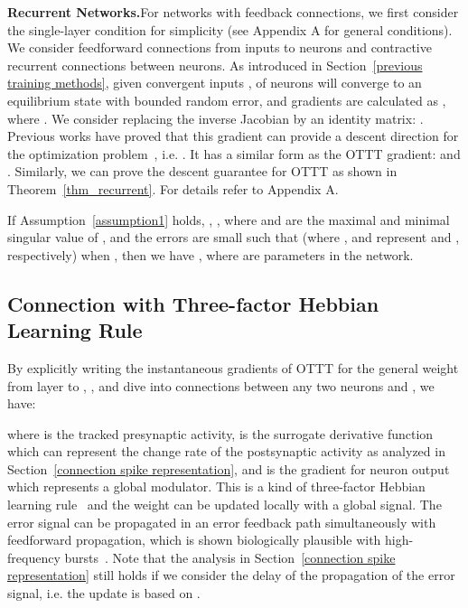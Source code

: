 \documentclass{article}
\begin{document}
\textbf{Recurrent Networks.}\quad For networks with feedback connections, we first consider the single-layer condition for simplicity (see Appendix A for general conditions). We consider feedforward connections  from inputs to neurons and contractive recurrent connections  between neurons. As introduced in Section~\ref{previous training methods}, given convergent inputs ,  of neurons will converge to an equilibrium state  with bounded random error, and gradients are calculated as , where . 
We consider replacing the inverse Jacobian by an identity matrix: . 
Previous works have proved that this gradient can provide a descent direction for the optimization problem~\cite{fung2021jfb,geng2021training}, i.e. . It has a similar form as the OTTT gradient:   and . 
Similarly, we can prove the descent guarantee for OTTT as shown in Theorem~\ref{thm_recurrent}. 
For details refer to Appendix A.
\begin{thm}\label{thm_recurrent}
If Assumption~\ref{assumption1} holds, , , where  and  are the maximal and minimal singular value of , and the errors  are small such that  (where ,  and  represent  and , respectively) when , then we have , where  are parameters in the network.
\end{thm}
\vspace{-1mm}

\vspace{-2mm}
\subsection{Connection with Three-factor Hebbian Learning Rule}\label{connection hebbian}
\vspace{-2mm}
By explicitly writing the instantaneous gradients of OTTT for the general weight from layer  to ,  , and dive into connections between any two neurons  and , we have:
\vspace{-1.5mm}

where  is the tracked presynaptic activity,  is the surrogate derivative function which can represent the change rate of the postsynaptic activity as analyzed in Section~\ref{connection spike representation}, and  is the gradient for neuron output  which represents a global modulator. This is a kind of three-factor Hebbian learning rule~\cite{fremaux2016neuromodulated} and the weight can be updated locally with a global signal. The error signal  can be propagated in an error feedback path simultaneously with feedforward propagation, which is shown biologically plausible with high-frequency bursts~\cite{payeur2021burst}. Note that the analysis in Section~\ref{connection spike representation} still holds if we consider the delay of the propagation of the error signal, i.e. the update is based on .
\end{document}
